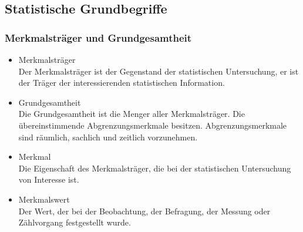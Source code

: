 \subsection{Statistische Grundbegriffe}
\subsubsection{Merkmalsträger und Grundgesamtheit}
\begin{itemize}
\item Merkmalsträger\\
Der Merkmalsträger ist der Gegenstand der statistischen Untersuchung, er ist der Träger der interessierenden statistischen Information.
\item Grundgesamtheit\\
Die Grundgesamtheit ist die Menger aller Merkmalsträger. Die übereinstimmende Abgrenzungsmerkmale besitzen. Abgrenzungsmerkmale sind räumlich, sachlich und zeitlich vorzunehmen.
\item Merkmal\\
Die Eigenschaft des Merkmalsträger, die bei der statistischen Untersuchung von Interesse ist.
\item Merkmalswert\\
Der Wert, der bei der Beobachtung, der Befragung, der Messung oder Zählvorgang festgestellt wurde.
\end{itemize}
